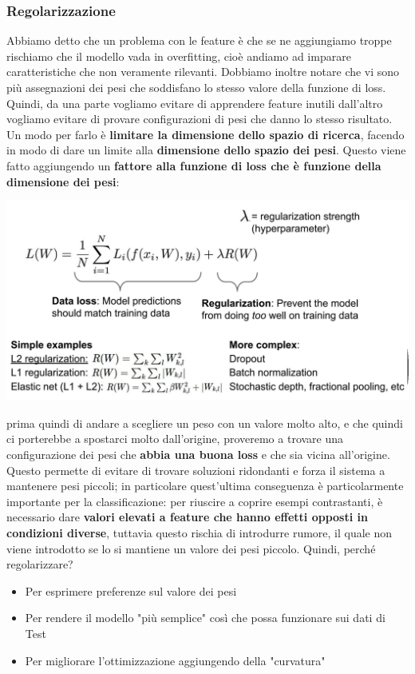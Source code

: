 \documentclass[12pt]{article}
\begin{document}
\subsubsection{Regolarizzazione}
Abbiamo detto che un problema con le feature è che se ne aggiungiamo troppe rischiamo che il modello vada in overfitting, cioè andiamo ad imparare caratteristiche che non veramente rilevanti.
Dobbiamo inoltre notare che vi sono più assegnazioni dei pesi che soddisfano lo stesso valore della funzione di loss.
Quindi, da una parte vogliamo evitare di apprendere feature inutili dall'altro vogliamo evitare di provare configurazioni di pesi che danno lo stesso risultato.
Un modo per farlo è \textbf{limitare la dimensione dello spazio di ricerca}, facendo in modo di dare un limite alla \textbf{dimensione dello spazio dei pesi}.
Questo viene fatto aggiungendo un \textbf{fattore alla funzione di loss che è funzione della dimensione dei pesi}:
\begin{center}
    \includegraphics[width =0.90\linewidth]{Images/176.PNG}
\end{center}
prima quindi di andare a scegliere un peso con un valore molto alto, e che quindi ci porterebbe a spostarci molto dall'origine, proveremo a trovare una configurazione dei pesi che \textbf{abbia una buona loss} e che sia vicina all'origine.
Questo permette di evitare di trovare soluzioni ridondanti e forza il sistema a mantenere pesi piccoli; in particolare quest'ultima conseguenza è particolarmente importante per la classificazione: per riuscire a coprire esempi contrastanti, è necessario
dare \textbf{valori elevati a feature che hanno effetti opposti in condizioni diverse}, tuttavia questo rischia di introdurre rumore, il quale non viene introdotto se lo si mantiene un valore dei pesi piccolo.
Quindi, perché regolarizzare?
\begin{itemize}
    \item Per esprimere preferenze sul valore dei pesi
    \item Per rendere il modello "più semplice" così che possa funzionare sui dati di Test
    \item Per migliorare l'ottimizzazione aggiungendo della "curvatura"
\end{itemize}
\end{document}
